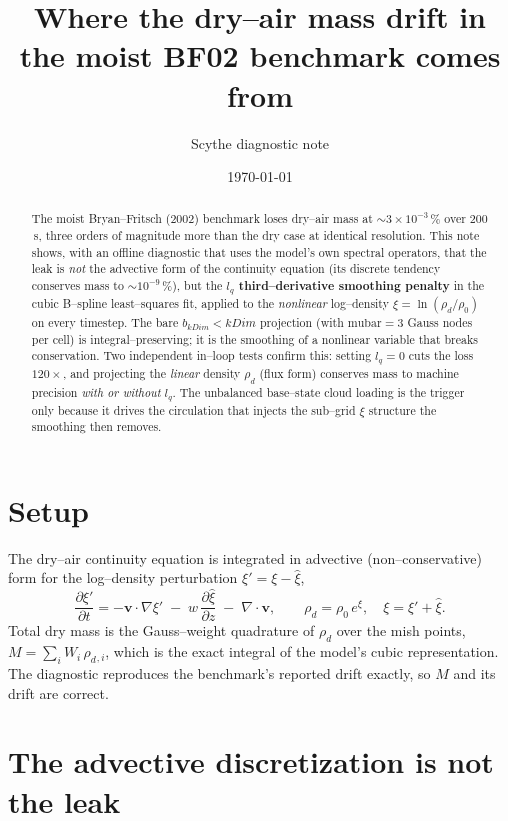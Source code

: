 \documentclass[11pt]{article}
\title{Where the dry--air mass drift in the moist BF02 benchmark comes from}
\author{Scythe diagnostic note}
\date{\today}
\newcommand{\vv}{\mathbf{v}}
\newcommand{\rd}{\rho_d}
\newcommand{\xhat}{\hat{\xi}}
\begin{document}
\maketitle

\begin{abstract}
The moist Bryan--Fritsch (2002) benchmark loses dry--air mass at
$\sim 3\times10^{-3}\,\%$ over $200$\,s, three orders of magnitude more than the
dry case at identical resolution. This note shows, with an offline diagnostic
that uses the model's own spectral operators, that the leak is \emph{not} the
advective form of the continuity equation (its discrete tendency conserves mass
to $\sim10^{-9}\,\%$), but the \textbf{$l_q$ third--derivative smoothing penalty}
in the cubic B--spline least--squares fit, applied to the \emph{nonlinear}
log--density $\xi=\ln(\rd/\rho_0)$ on every timestep. The bare $b_{kDim}<kDim$
projection (with $\mathrm{mubar}=3$ Gauss nodes per cell) is integral--preserving;
it is the smoothing of a nonlinear variable that breaks conservation. Two
independent in--loop tests confirm this: setting $l_q=0$ cuts the loss $120\times$,
and projecting the \emph{linear} density $\rd$ (flux form) conserves mass to
machine precision \emph{with or without} $l_q$. The unbalanced base--state cloud
loading is the trigger only because it drives the circulation that injects the
sub--grid $\xi$ structure the smoothing then removes.
\end{abstract}

\section{Setup}

The dry--air continuity equation is integrated in advective (non--conservative)
form for the log--density perturbation $\xi'=\xi-\xhat$,
\begin{equation}
  \frac{\partial \xi'}{\partial t}
   = -\vv\cdot\nabla\xi' \;-\; w\,\frac{\partial\xhat}{\partial z}
     \;-\; \nabla\cdot\vv ,
  \qquad \rd=\rho_0\,e^{\xi}, \quad \xi=\xi'+\xhat .
  \label{eq:cont}
\end{equation}
Total dry mass is the Gauss--weight quadrature of $\rd$ over the mish points,
$M=\sum_i W_i\,\rd{}_{,i}$, which is the exact integral of the model's cubic
representation. The diagnostic reproduces the benchmark's reported drift
exactly, so $M$ and its drift are correct.

\section{The advective discretization is not the leak}
\end{document}
